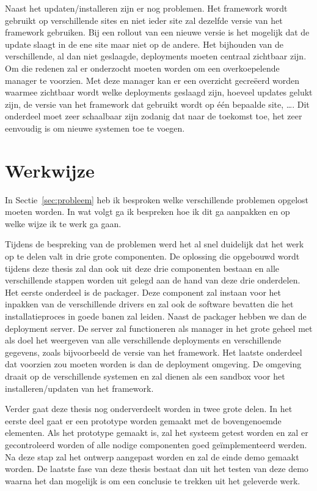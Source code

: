 Naast het updaten/installeren zijn er nog problemen.
Het framework wordt gebruikt op verschillende sites en niet ieder site zal dezelfde versie van het framework gebruiken.
Bij een rollout van een nieuwe versie is het mogelijk dat de update slaagt in de ene site maar niet op de andere.
Het bijhouden van de verschillende, al dan niet geslaagde, deployments moeten centraal zichtbaar zijn.
Om die redenen zal er onderzocht moeten worden om een overkoepelende manager te voorzien.
Met deze manager kan er een overzicht gecreëerd worden waarmee zichtbaar wordt welke deployments geslaagd zijn, hoeveel updates gelukt zijn, de versie van het framework dat gebruikt wordt op één bepaalde site, \ldots .
Dit onderdeel moet zeer schaalbaar zijn zodanig dat naar de toekomst toe, het zeer eenvoudig is om nieuwe systemen toe te voegen.

\section{Werkwijze}
In Sectie~\ref{sec:probleem} heb ik besproken welke verschillende problemen opgelost moeten worden.
In wat volgt ga ik bespreken hoe ik dit ga aanpakken en op welke wijze ik te werk ga gaan.

Tijdens de bespreking van de problemen werd het al snel duidelijk dat het werk op te delen valt in drie grote componenten.
De oplossing die opgebouwd wordt tijdens deze thesis zal dan ook uit deze drie componenten bestaan en alle verschillende stappen worden uit gelegd aan de hand van deze drie onderdelen.
Het eerste onderdeel is de packager.
Deze component zal instaan voor het inpakken van de verschillende drivers en zal ook de software bevatten die het installatieproces in goede banen zal leiden.
Naast de packager hebben we dan de deployment server.
De server zal functioneren als manager in het grote geheel met als doel het weergeven van alle verschillende deployments en verschillende gegevens, zoals bijvoorbeeld de versie van het framework.
Het laatste onderdeel dat voorzien zou moeten worden is dan de deployment omgeving.
De omgeving draait op de verschillende systemen en zal dienen als een sandbox voor het installeren/updaten van het framework.

Verder gaat deze thesis nog onderverdeelt worden in twee grote delen.
In het eerste deel gaat er een prototype worden gemaakt met de bovengenoemde elementen.
Als het prototype gemaakt is, zal het systeem getest worden en zal er gecontroleerd worden of alle nodige componenten goed geïmplementeerd werden.
Na deze stap zal het ontwerp aangepast worden en zal de einde demo gemaakt worden.
De laatste fase van deze thesis bestaat dan uit het testen van deze demo waarna het dan mogelijk is om een conclusie te trekken uit het geleverde werk.

